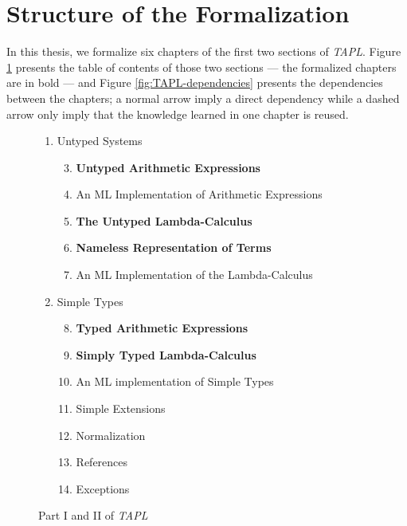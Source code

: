 \section{Structure of the Formalization}
\label{sec:structure-of-formalization}

In this thesis, we formalize six chapters of the first two sections of \emph{TAPL}. Figure
\ref{fig:TAPL-toc} presents the table of contents of those two sections --- the formalized chapters
are in bold --- and Figure \ref{fig:TAPL-dependencies} presents the dependencies between the
chapters; a normal arrow imply a direct dependency while a dashed arrow only imply that the
knowledge learned in one chapter is reused.

\begin{figure}[h]
  \footnotesize
  \centering
  \begin{varwidth}{\textwidth}
    \begin{enumerate}[label=\Roman*]
      \itemsep 1pt
      \item Untyped Systems \hfill
        \begin{enumerate}[label=§ \arabic*]
          \setcounter{enumii}{2}
          \item \textbf{Untyped Arithmetic Expressions}
          \item An ML Implementation of Arithmetic Expressions
          \item \textbf{The Untyped Lambda-Calculus}
          \item \textbf{Nameless Representation of Terms}
          \item An ML Implementation of the Lambda-Calculus
        \end{enumerate}
      \item Simple Types \hfill
        \begin{enumerate}[label=§ \arabic*]
          \setcounter{enumii}{7}
          \item \textbf{Typed Arithmetic Expressions}
          \item \textbf{Simply Typed Lambda-Calculus}
          \item An ML implementation of Simple Types
          \item Simple Extensions
          \item Normalization
          \item References
          \item Exceptions
        \end{enumerate}
    \end{enumerate}
  \end{varwidth}
  \caption{Part I and II of \emph{TAPL}}
  \label{fig:TAPL-toc}
\end{figure}

